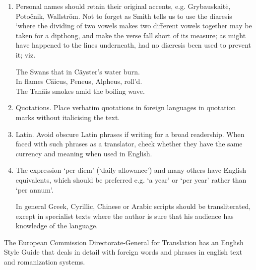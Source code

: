 \begin{enumerate}
\item Personal names should retain their original accents, e.g. Grybauskait\.{e},
Potočnik, Wallström. Not to forget as Smith tells us to use the diaresis `where the dividing of two vowels makes two different vowels together may be taken for a dipthong, and make the verse fall short of its measure; as might have happened to the lines underneath, had no di\ae resis been used to prevent it; viz.

{\hskip3cm \narrower\narrower\it

 The Swans that in C\"ayster's water burn.\\
 In flames C\"aicus, Peneus, Alpheus, roll'd.\\
 The Tan\"ais smokes amid the boiling wave.\\

}

\item Quotations. Place verbatim quotations in foreign languages in quotation marks
without italicising the text.

\item Latin. Avoid obscure Latin phrases if writing for a broad readership. When
faced with such phrases as a translator, check whether they have the same
currency and meaning when used in English.

\item The expression ‘per diem’ (‘daily allowance’) and many others have English
equivalents, which should be preferred e.g. ‘a year’ or ‘per year’ rather than ‘per annum’.

In general Greek, Cyrillic, Chinese or Arabic scripts should be transliterated, except in specialist texts where the author is sure that his audience has knowledge of the language.

\end{enumerate}

The European Commission Directorate-General for Translation has an English Style Guide that deals in detail with foreign words and phrases in english text and romanization systems.




















